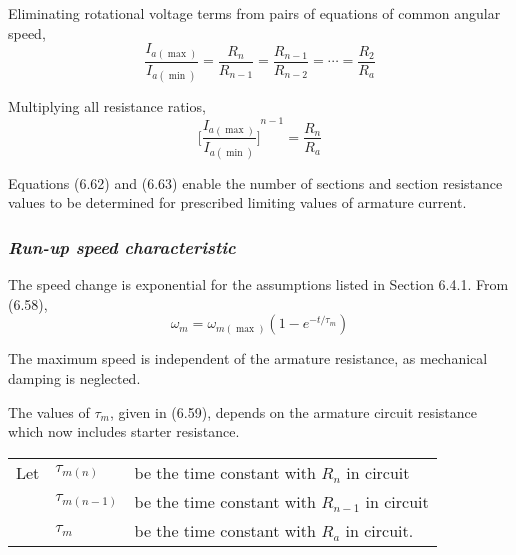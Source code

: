 \documentclass[a4paper,numbers=noenddot,12pt]{scrbook}
\begin{document}
Eliminating rotational voltage terms from pairs of equations of common angular speed,
\begin{equation}
    \dfrac{I_{a(\max)}}{I_{a(\min)}} = \dfrac{R_n}{R_{n-1}} = \dfrac{R_{n-1}}{R_{n-2}} = \cdots = \dfrac{R_2}{R_a}
    \label{}
\end{equation}

Multiplying all resistance ratios,
\begin{equation}
    {\bigg[\dfrac{I_{a(\max)}}{I_{a(\min)}}\bigg]}^{n - 1} = \dfrac{R_n}{R_a}
    \label{}
\end{equation}

Equations (6.62) and (6.63) enable the number of sections and section resistance values to be determined for prescribed limiting values of armature current.

\subsubsection{\textit{Run-up speed characteristic}}
The speed change is exponential for the assumptions listed in Section 6.4.1.
From (6.58),
\begin{equation*}
    \omega_m = \omega_{m (\max)}(1 - e^{-t / \tau_m})
\end{equation*}

The maximum speed is independent of the armature resistance, as mechanical damping is neglected.

The values of $\tau_m$, given in (6.59), depends on the armature circuit resistance which now includes starter resistance. \par \smallskip
\begin{tabularx}{\textwidth}{l@{\enskip}ll}
    Let & $\tau_{m(n)}$ & be the time constant with $R_n$ in circuit \\
    & $\tau_{m(n-1)}$ & be the time constant with $R_{n-1}$ in circuit \\
    & $\tau_{m}$ & be the time constant with $R_{a}$ in circuit. \\
\end{tabularx}
\end{document}

